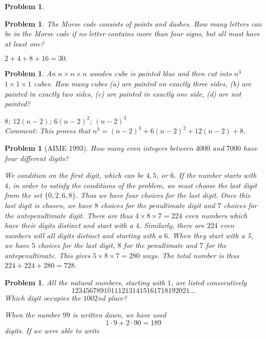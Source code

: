 \documentclass[11pt, openany]{book}
\theoremstyle{change} \theoremheaderfont{\blue\sffamily\bfseries}
\newtheorem{pro}[thm]{Problem}
\theoremstyle{nonumberplain} \theoremheaderfont{\sffamily\bfseries}
\newcommand{\í}{\'{\i}}
\begin{document}
\begin{multicols}{2}
\begin{pro}
\begin{answer}
\end{answer}
    \end{pro}
     \begin{pro} The Morse code consists of points and dashes. How many letters
can be in the Morse code if no letter contains more than four signs,
but all must have at least one?\begin{answer} $2 + 4 + 8 + 16 = 30.$
\end{answer}
 \end{pro}
         \begin{pro}
An $n\times n \times n$ wooden cube is painted blue and then cut
into $n^3$ $1\times 1 \times 1$ cubes. How many cubes (a) are
painted on exactly three sides, (b) are painted in exactly two
sides, (c) are painted in exactly one side, (d) are not painted?
\begin{answer}$8$; $12(n - 2)$; $6(n - 2)^2$; $(n - 2)^3$\\
Comment: This proves that $n^3 = (n-2)^3 + 6(n-2)^2 + 12(n-2) + 8$.
\end{answer}
  \end{pro}
\begin{pro}[AIME 1993] How many even integers between $4000$ and
$7000$ have four different digits? \begin{answer} We condition on
the first digit, which can be $4, 5$, or $6$. If the number starts
with $4$, in order to satisfy the conditions of the problem, we must
choose the last digit from the set $\{0, 2, 6, 8\}$. Thus we have
four choices for the last digit. Once this last digit is chosen, we
have $8$ choices for the penultimate digit and $7$ choices for the
antepenultimate digit. There are thus $4\times 8\times 7 = 224$ even
numbers which have their digits distinct and start with a $4$.
Similarly, there are $224$ even numbers will all digits distinct and
starting with a $6$. When they start with a 5, we have $5$ choices
for the last digit, $8$ for the penultimate and $7$ for the
antepenultimate. This gives $5\times 8\times 7 = 280$ ways. The
total number is thus $224 + 224 + 280 =  728$.
\end{answer}
\end{pro}
\begin{pro}
All the natural numbers, starting with $1$, are listed consecutively
$$123456789101112131415161718192021\ldots$$Which digit occupies the $1002$nd place?
\begin{answer} When the number $99$ is written down, we have used
$$1\cdot 9 + 2\cdot 90 = 189$$ digits. If we were able to write

\end{answer}
\end{pro}
\end{multicols}
\end{document}
